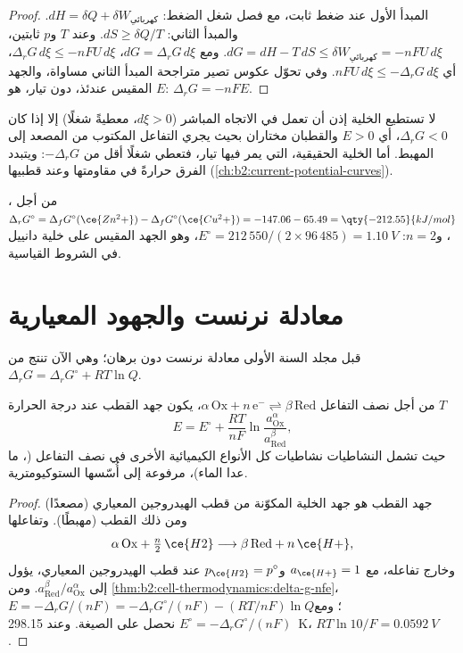 \begin{proof}
المبدأ الأول عند ضغط ثابت، مع فصل شغل الضغط:
$dH = \delta Q + \delta W_{\text{كهربائي}}$. والمبدأ الثاني: $dS \geq \delta Q/T$. وعند
$T$ و$p$ ثابتين، $dG = dH - T\,dS \leq \delta W_{\text{كهربائي}} = -nFU\,d\xi$.
ومع $dG = \Delta_r G\,d\xi$، $\Delta_r G\,d\xi \leq -nFU\,d\xi$، أي
$nFU\,d\xi \leq -\Delta_r G\,d\xi$. وفي تحوّل عكوس تصير متراجحة
المبدأ الثاني مساواة، والجهد المقيس عندئذ، دون
تيار، هو $E$: $\Delta_r G = -nFE$.
\end{proof}

لا تستطيع الخلية إذن أن تعمل في الاتجاه المباشر ($d\xi > 0$، معطيةً شغلًا) إلا إذا كان $\Delta_r G <
0$، أي $E > 0$ والقطبان مختاران بحيث يجري التفاعل المكتوب
من المصعد إلى المهبط. أما الخلية الحقيقية، التي يمر فيها تيار، فتعطي
شغلًا أقل من $-\Delta_r G$: ويتبدد الفرق حرارةً في
مقاومتها وعند قطبيها (\cref{ch:b2:current-potential-curves}).

\begin{example}\label{ex:b2:cell-thermodynamics:daniell}
من أجل ، $\Delta_r G^\circ = \Delta_f G^\circ(\ce{Zn^2+}) -
\Delta_f G^\circ(\ce{Cu^2+}) = -147.06 - 65.49 = \qty{-212.55}{kJ/mol}$، و$n = 2$:
$E^\circ = 212\,550/(2 \times 96\,485) = \qty{1.10}{V}$، وهو الجهد المقيس على
خلية دانييل في الشروط القياسية.
\end{example}

\section{معادلة نرنست والجهود المعيارية}

قبل مجلد السنة الأولى معادلة نرنست دون برهان؛ وهي الآن تنتج من
$\Delta_r G = \Delta_r G^\circ + RT\ln Q$.

\begin{theorem}\label{thm:b2:cell-thermodynamics:nernst-derived}
من أجل نصف التفاعل $\alpha\,\mathrm{Ox} + n\,\mathrm e^- \rightleftharpoons
\beta\,\mathrm{Red}$، يكون جهد القطب عند درجة الحرارة $T$
\[
  E = E^\circ + \frac{RT}{nF}\ln\frac{a_{\mathrm{Ox}}^{\alpha}}{a_{\mathrm{Red}}^{\beta}} ,
\]
حيث تشمل النشاطيات نشاطيات كل الأنواع الكيميائية الأخرى في
نصف التفاعل (، ما عدا الماء)، مرفوعة إلى أُسّسها الستوكيومترية.
\end{theorem}

\begin{proof}
جهد القطب هو جهد الخلية المكوّنة من قطب الهيدروجين المعياري
(مصعدًا) ومن ذلك القطب (مهبطًا). وتفاعلها
\[
  \alpha\,\mathrm{Ox} + \tfrac n2\,\ce{H2} \longrightarrow \beta\,\mathrm{Red} + n\,\ce{H+} ,
\]
وخارج تفاعله، مع $a_{\ce{H+}} = 1$ و$p_{\ce{H2}} = p^\circ$ عند
قطب الهيدروجين المعياري، يؤول إلى $a_{\mathrm{Red}}^\beta/
a_{\mathrm{Ox}}^\alpha$. ومن \cref{thm:b2:cell-thermodynamics:delta-g-nfe}،
$E = -\Delta_r G/(nF) = -\Delta_r G^\circ/(nF) - (RT/nF)\ln Q$؛ ومع $E^\circ =
-\Delta_r G^\circ/(nF)$ نحصل على الصيغة. وعند \qty{298.15}{K}، $RT\ln 10/F =
\qty{0.0592}{V}$.
\end{proof}

